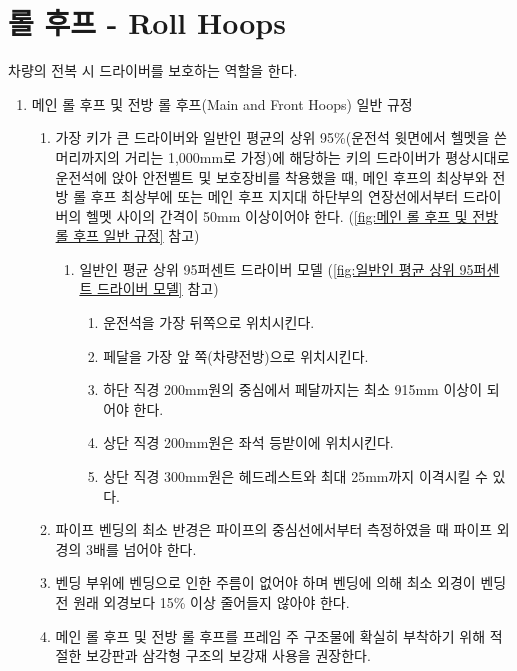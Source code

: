 \documentclass[final,a4paper,10pt]{report}
\begin{document}
\section{롤 후프 - Roll Hoops}
차량의 전복 시 드라이버를 보호하는 역할을 한다.

\begin{enumerate}
  \item 메인 롤 후프 및 전방 롤 후프(Main and Front Hoops) 일반 규정
    \begin{enumerate}
      \item 가장 키가 큰 드라이버와 일반인 평균의 상위 95\%(운전석 윗면에서 헬멧을 쓴 머리까지의 거리는 1,000mm로 가정)에 해당하는 키의 드라이버가 평상시대로 운전석에 앉아 안전벨트 및 보호장비를 착용했을 때, 메인 후프의 최상부와 전방 롤 후프 최상부에 또는 메인 후프 지지대 하단부의 연장선에서부터 드라이버의 헬멧 사이의 간격이 50mm 이상이어야 한다. (\cref{fig:메인 롤 후프 및 전방 롤 후프 일반 규정} 참고)
        \begin{enumerate}
          \item 일반인 평균 상위 95퍼센트 드라이버 모델 (\cref{fig:일반인 평균 상위 95퍼센트 드라이버 모델} 참고)
          \begin{enumerate}
            \item 운전석을 가장 뒤쪽으로 위치시킨다.
            \item 페달을 가장 앞 쪽(차량전방)으로 위치시킨다.
            \item 하단 직경 200mm원의 중심에서 페달까지는 최소 915mm 이상이 되어야 한다.
            \item 상단 직경 200mm원은 좌석 등받이에 위치시킨다.
            \item 상단 직경 300mm원은 헤드레스트와 최대 25mm까지 이격시킬 수 있다.
          \end{enumerate}
        \end{enumerate}
        
      \item 파이프 벤딩의 최소 반경은 파이프의 중심선에서부터 측정하였을 때 파이프 외경의 3배를 넘어야 한다.
      \item 벤딩 부위에 벤딩으로 인한 주름이 없어야 하며 벤딩에 의해 최소 외경이 벤딩 전 원래 외경보다 15\% 이상 줄어들지 않아야 한다.
      \item 메인 롤 후프 및 전방 롤 후프를 프레임 주 구조물에 확실히 부착하기 위해 적절한 보강판과 삼각형 구조의 보강재 사용을 권장한다.
      
      

\end{enumerate}
\end{enumerate}
\end{document}
